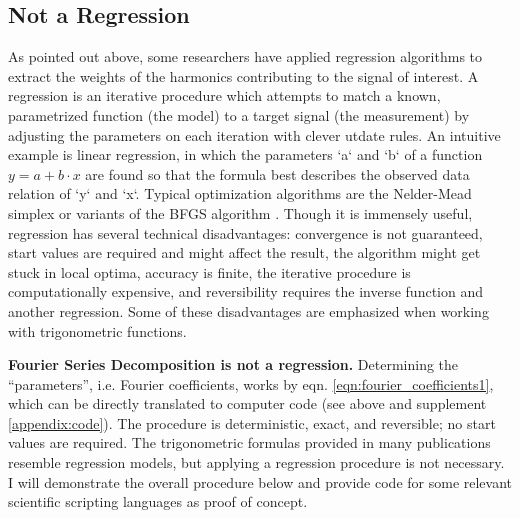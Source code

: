 \subsection{Not a Regression}
\label{sec:orgfa97873}
As pointed out above, some researchers have applied regression algorithms to extract the weights of the harmonics contributing to the signal of interest.
A regression is an iterative procedure which attempts to match a known, parametrized function (the model) to a target signal (the measurement) by adjusting the parameters on each iteration with clever utdate rules.
An intuitive example is linear regression, in which the parameters `a` and `b` of a function \(y=a+b\cdot x\) are found so that the formula best describes the observed data relation of `y` and `x`.
Typical optimization algorithms are the Nelder-Mead simplex \citep{Nelder1965} or variants of the BFGS algorithm \citep{Broyden1970,Fletcher1970,Goldfrab1970,Shanno1970,Zhu1997}.
Though it is immensely useful, regression has several technical disadvantages: convergence is not guaranteed, start values are required and might affect the result, the algorithm might get stuck in local optima, accuracy is finite, the iterative procedure is computationally expensive, and reversibility requires the inverse function and another regression.
Some of these disadvantages are emphasized when working with trigonometric functions.


\textbf{Fourier Series Decomposition is not a regression.}
Determining the ``parameters'', i.e. Fourier coefficients, works by eqn. \eqref{eqn:fourier_coefficients1}, which can be directly translated to computer code (see above and supplement \ref{appendix:code}).
The procedure is deterministic, exact, and reversible; no start values are required.
The trigonometric formulas provided in many publications resemble regression models, but applying a regression procedure is not necessary.
I will demonstrate the overall procedure below and provide code for some relevant scientific scripting languages as proof of concept.


